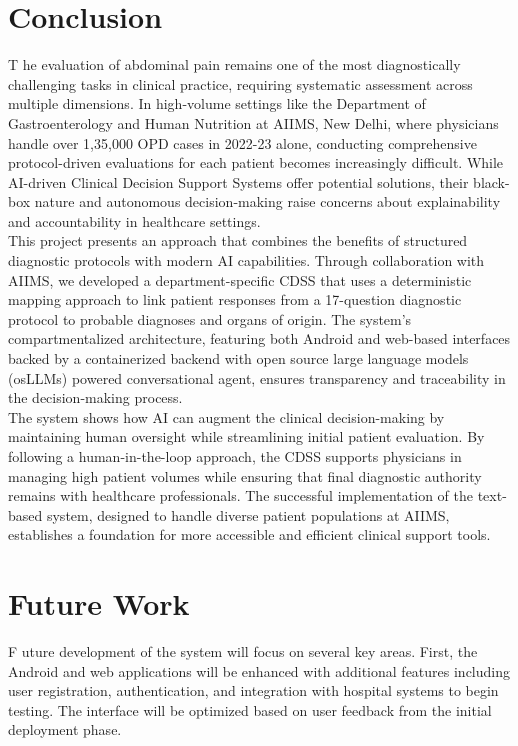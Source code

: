 \section{Conclusion}
\lettrine{T}{ }he evaluation of abdominal pain remains one of the most diagnostically challenging tasks in clinical practice, requiring systematic assessment across multiple dimensions. In high-volume settings like the Department of Gastroenterology and Human Nutrition at AIIMS, New Delhi, where physicians handle over 1,35,000 OPD cases in 2022-23 alone, conducting comprehensive protocol-driven evaluations for each patient becomes increasingly difficult. While AI-driven Clinical Decision Support Systems offer potential solutions, their black-box nature and autonomous decision-making raise concerns about explainability and accountability in healthcare settings.\\[\baselineskip]

\noindent This project presents an approach that combines the benefits of structured diagnostic protocols with modern AI capabilities. Through collaboration with AIIMS, we developed a department-specific CDSS that uses a deterministic mapping approach to link patient responses from a 17-question diagnostic protocol to probable diagnoses and organs of origin. The system's compartmentalized architecture, featuring both Android and web-based interfaces backed by a containerized backend with open source large language models (osLLMs) powered conversational agent, ensures transparency and traceability in the decision-making process.\\[\baselineskip]

\noindent The system shows how AI can augment the clinical decision-making by maintaining human oversight while streamlining initial patient evaluation. By following a human-in-the-loop approach, the CDSS supports physicians in managing high patient volumes while ensuring that final diagnostic authority remains with healthcare professionals. The successful implementation of the text-based system, designed to handle diverse patient populations at AIIMS, establishes a foundation for more accessible and efficient clinical support tools.

\section{Future Work}
\lettrine{F}{ }uture development of the system will focus on several key areas. First, the Android and web applications will be enhanced with additional features including user registration, authentication, and integration with hospital systems to begin testing. The interface will be optimized based on user feedback from the initial deployment phase.\\[\baselineskip]

